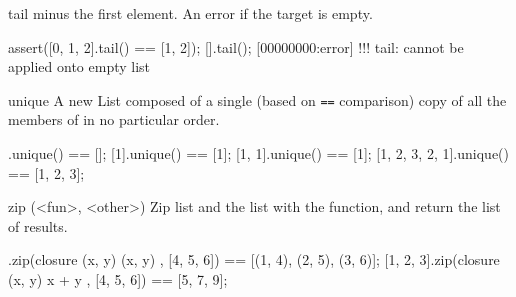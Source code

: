 \begin{urbiscriptapi}
\item[tail]%
  \this minus the first element. An error if the target is empty.
\begin{urbiscript}
assert([0, 1, 2].tail() == [1, 2]);
[].tail();
[00000000:error] !!! tail: cannot be applied onto empty list
\end{urbiscript}


\item[unique]%
  A new List composed of a single (based on \lstinline|==| comparison) copy
  of all the members of \this in no particular order.
\begin{urbiassert}
             [].unique() == [];
            [1].unique() == [1];
         [1, 1].unique() == [1];
[1, 2, 3, 2, 1].unique() == [1, 2, 3];
\end{urbiassert}


\item[zip](<fun>, <other>)%
  Zip \this list and the  list with the  function, and
  return the list of results.

\begin{urbiassert}
[1, 2, 3].zip(closure (x, y) { (x, y) }, [4, 5, 6])
       == [(1, 4), (2, 5), (3, 6)];
[1, 2, 3].zip(closure (x, y) { x + y }, [4, 5, 6])
       == [5, 7, 9];
\end{urbiassert}
\end{urbiscriptapi}

